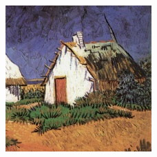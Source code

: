 \documentclass{article}
\begin{document}
\begin{figure}
\begin{subfigure}[b]{0.3\linewidth}
    \end{subfigure}
    \hfill
    \begin{subfigure}[b]{0.3\linewidth}
        \includegraphics[width=\textwidth]{report/img/data_aug/19616.jpg}
    \end{subfigure}
    \hfill

\end{figure}
\end{document}
